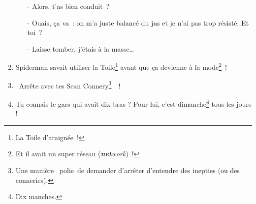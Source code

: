\documentclass[10pt,a5paper,fullpage]{book}
\begin{document}
\begin{enumerate}
\begin{itemize}
			\item[-] Alors, t’as bien conduit~?
			\item[-] Ouais, ça va~: on m’a juste balancé du jus et je n’ai pas trop résisté. Et toi~?
			\item[-] Laisse tomber, j’étais à la masse… 
		\end{itemize}
		\item Spiderman savait utiliser la Toile\footnote{La Toile d’araignée~!} avant que ça devienne à la mode\footnote{Et il avait un super réseau (\textit{\textbf{net}work})~!}~!
		\item \guillemotleft~Arrête avec tes Sean Connery\footnote{Une manière \guillemotleft~polie~\guillemotright de demander d'arrêter d'entendre des inepties (ou des conneries).}~\guillemotright~!
		\item Tu connais le gars qui avait dix bras ? Pour lui, c'est dimanche\footnote{Dix manches.} tous les jours !
	\end{enumerate}
	
\end{document}
